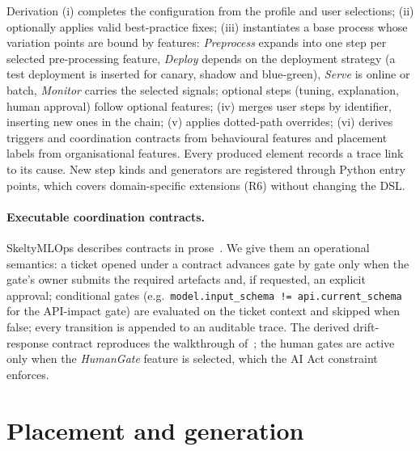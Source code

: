 \documentclass[10pt,a4paper]{article}
\begin{document}
Derivation (i) completes the configuration from the profile and user selections;
(ii) optionally applies valid best-practice fixes; (iii) instantiates a base
process whose variation points are bound by features: \emph{Preprocess} expands into
one step per selected pre-processing feature, \emph{Deploy} depends on the
deployment strategy (a test deployment is inserted for canary, shadow and
blue-green), \emph{Serve} is online or batch, \emph{Monitor} carries the selected
signals; optional steps (tuning, explanation, human approval) follow optional
features; (iv) merges user steps by identifier, inserting new ones in the chain;
(v) applies dotted-path overrides; (vi) derives triggers and coordination
contracts from behavioural features and placement labels from organisational
features. Every produced element records a trace link to its cause. New step kinds
and generators are registered through Python entry points, which covers
domain-specific extensions (R6) without changing the DSL.

\paragraph{Executable coordination contracts.} SkeltyMLOps describes contracts in
prose~\cite{daoud2026}. We give them an operational semantics: a ticket opened under
a contract advances gate by gate only when the gate's owner submits the required
artefacts and, if requested, an explicit approval; conditional gates (e.g.\
\texttt{model.input\_schema != api.current\_schema} for the API-impact gate) are
evaluated on the ticket context and skipped when false; every transition is
appended to an auditable trace. The derived drift-response contract reproduces the
walkthrough of~\cite{daoud2026}; the human gates are active only when the
\emph{HumanGate} feature is selected, which the AI Act constraint enforces.

\section{Placement and generation}
\end{document}
